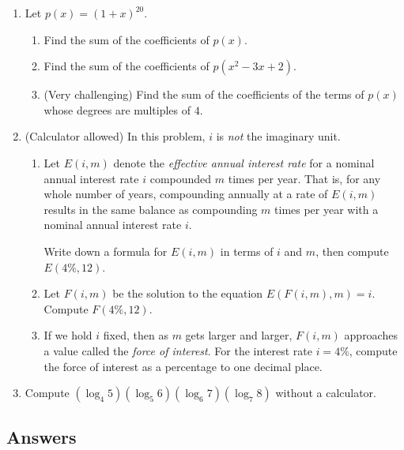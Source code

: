 \begin{enumerate}[resume]
\item Let $p(x) = (1 + x)^{20}$.
\begin{enumerate}
\item Find the sum of the coefficients of $p(x)$.
\item Find the sum of the coefficients of $p(x^2 - 3x + 2)$.
\item (Very challenging) Find the sum of the coefficients of the terms of $p(x)$ whose degrees are multiples of $4$.
\end{enumerate}
\item (Calculator allowed) In this problem, $i$ is \emph{not} the imaginary unit.
\begin{enumerate}
\item Let $E(i,m)$ denote the \emph{effective annual interest rate} for a nominal annual interest rate $i$ compounded $m$ times per year. That is, for any whole number of years, compounding annually at a rate of $E(i,m)$ results in the same balance as compounding $m$ times per year with a nominal annual interest rate $i$.\par Write down a formula for $E(i,m)$ in terms of $i$ and $m$, then compute $E(4\%, 12)$.
\item Let $F(i,m)$ be the solution to the equation $E(F(i,m),m) = i$. Compute $F(4\%, 12)$.
\item If we hold $i$ fixed, then as $m$ gets larger and larger, $F(i,m)$ approaches a value called the \emph{force of interest}. For the interest rate $i = 4\%$, compute the force of interest as a percentage to one decimal place.
\end{enumerate}
\item Compute $(\log_4 5)(\log_5 6)(\log_6 7)(\log_7 8)$ without a calculator.
\end{enumerate}


\newpage
\subsection{Answers}

